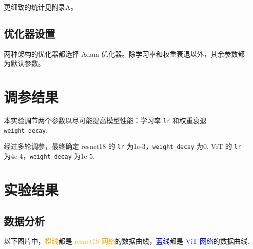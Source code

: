 \documentclass[notitlepage,cs4size,punct,oneside]{ctexrep}
\numberwithin{equation}{chapter}
\theoremstyle{mystyle}
\begin{document}
更细致的统计见附录A。

\subsection{优化器设置}
两种架构的优化器都选择 Adam 优化器。除学习率和权重衰退以外，其余参数都为默认参数。


\section{调参结果}
本实验调节两个参数以尽可能提高模型性能：学习率 \texttt{lr} 和权重衰退 \texttt{weight\_decay}.

经过多轮调参，最终确定 resnet18 的 \texttt{lr} 为1e-3，\texttt{weight\_decay} 为0. ViT 的 \texttt{lr} 为4e-4，\texttt{weight\_decay} 为1e-5.


\section{实验结果}
\subsection{数据分析}
以下图片中，\textcolor{orange}{橙线}都是 \textcolor{orange}{resnet18 网络}的数据曲线，\textcolor{blue}{蓝线}都是 \textcolor{blue}{ViT 网络}的数据曲线.
\end{document}
